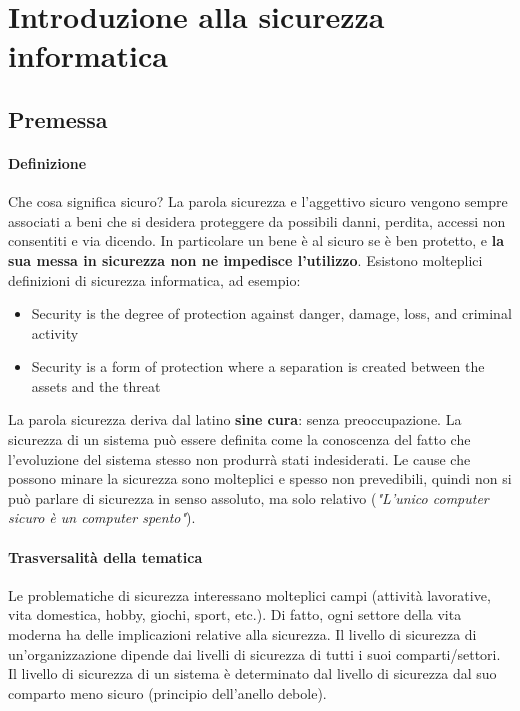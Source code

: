 \chapter{Introduzione alla sicurezza informatica}


\section{Premessa}

\subsubsection{Definizione}
Che cosa significa sicuro? La parola sicurezza e l'aggettivo sicuro vengono sempre associati a beni che si desidera proteggere da possibili danni, perdita, accessi non consentiti e via dicendo. In particolare un bene è al sicuro se è ben protetto, e \textbf{la sua messa in sicurezza non ne impedisce l'utilizzo}. Esistono molteplici definizioni di sicurezza informatica, ad esempio:
\begin{itemize} 
  \item Security is the degree of protection against danger, damage, loss, and criminal activity 
  \item Security is a form of protection where a separation is created between the assets and the threat 
\end{itemize}
La parola sicurezza deriva dal latino \textbf{sine cura}: senza preoccupazione. La sicurezza di un sistema può essere definita come la conoscenza del fatto che l’evoluzione del sistema stesso non produrrà stati indesiderati. Le cause che possono minare la sicurezza sono molteplici e spesso non prevedibili, quindi non si può parlare di sicurezza in senso assoluto, ma solo relativo (\textit{"L'unico computer sicuro è un computer spento"}).

\subsubsection{Trasversalità della tematica}
Le problematiche di sicurezza interessano molteplici campi (attività lavorative, vita domestica, hobby, giochi, sport, etc.). Di fatto, ogni settore della vita moderna ha delle implicazioni relative alla sicurezza. Il livello di sicurezza di un'organizzazione dipende dai livelli di sicurezza di tutti i suoi comparti/settori. Il livello di sicurezza di un sistema è determinato dal livello di sicurezza dal suo comparto meno sicuro (principio dell'anello debole).


